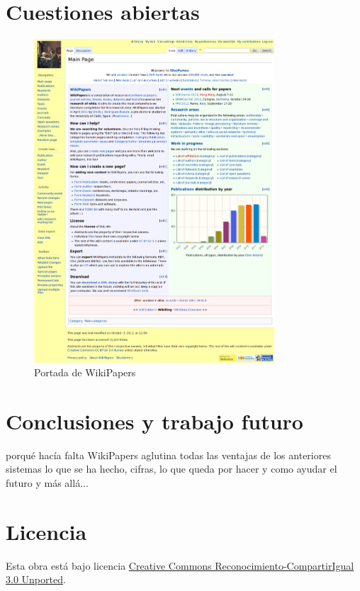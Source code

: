 \documentclass[11pt,onecolumn]{article}
\begin{document}
\section{Cuestiones abiertas}


\begin{figure}[htb]
\centering
\includegraphics[width=0.8\textwidth]{wpfull.png}
\caption{Portada de WikiPapers}
\label{fig:wpfull}
\end{figure}


\section{Conclusiones y trabajo futuro}
porqué hacía falta WikiPapers
aglutina todas las ventajas de los anteriores sistemas
lo que se ha hecho, cifras,
lo que queda por hacer y como ayudar
el futuro y más allá...



        


\section*{Licencia}
Esta obra está bajo licencia \href{http://creativecommons.org/licenses/by-sa/3.0/}{Creative Commons Reconocimiento-CompartirIgual 3.0 Unported}.
\end{document}

